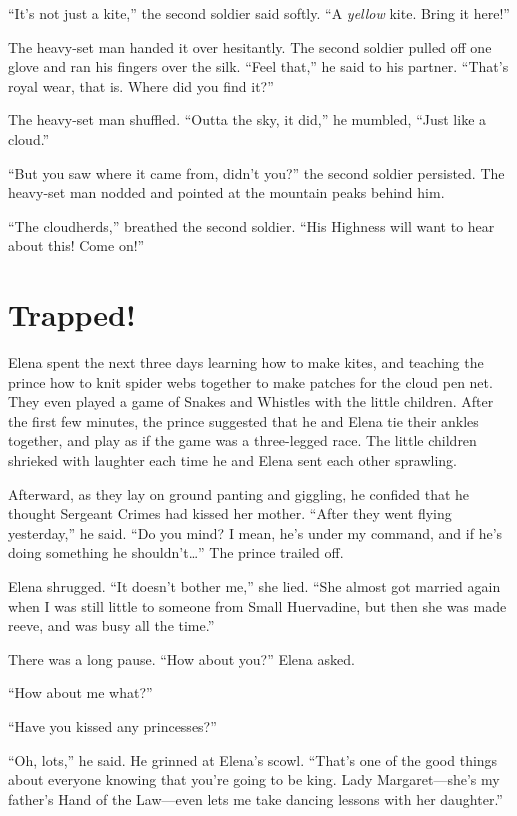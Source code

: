 \documentclass[10pt]{book}
\begin{document}
``It's not just a kite,'' the second soldier said softly. ``A \emph{yellow} kite. Bring it here!''

The heavy-set man handed it over hesitantly. The second soldier pulled off one glove and ran his fingers over the silk. ``Feel that,'' he said to his partner. ``That's royal wear, that is. Where did you find it?''

The heavy-set man shuffled. ``Outta the sky, it did,'' he mumbled, ``Just like a cloud.''

``But you saw where it came from, didn't you?'' the second soldier persisted. The heavy-set man nodded and pointed at the mountain peaks behind him.

``The cloudherds,'' breathed the second soldier. ``His Highness will want to hear about this! Come on!''

\chapter{Trapped!}

Elena spent the next three days learning how to make kites, and teaching the prince how to knit spider webs together to make patches for the cloud pen net. They even played a game of Snakes and Whistles with the little children. After the first few minutes, the prince suggested that he and Elena tie their ankles together, and play as if the game was a three-legged race. The little children shrieked with laughter each time he and Elena sent each other sprawling.

Afterward, as they lay on ground panting and giggling, he confided that he thought Sergeant Crimes had kissed her mother. ``After they went flying yesterday,'' he said. ``Do you mind? I mean, he's under my command, and if he's doing something he shouldn't{\ldots}'' The prince trailed off.

Elena shrugged. ``It doesn't bother me,'' she lied. ``She almost got married again when I was still little to someone from Small Huervadine, but then she was made reeve, and was busy all the time.''

There was a long pause. ``How about you?'' Elena asked.

``How about me what?''

``Have you kissed any princesses?''

``Oh, lots,'' he said.  He grinned at Elena's scowl.  ``That's one of the good things about everyone knowing that you're going to be king. Lady Margaret---she's my father's Hand of the Law---even lets me take dancing lessons with her daughter.''
\end{document}
